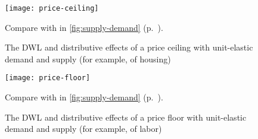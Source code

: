 \begin{figure}[htbp]
	\begin{center}
	\texttt{[image: price-ceiling]}
	\caption[Efficiency and Equity of a Price Ceiling]{The \gls{DWL} and distributive effects of a price ceiling with unit-elastic demand and supply (for example, of housing)}
	\end{center}
	\scriptsize{Compare with  in \autoref{fig:supply-demand} (p.~\pageref{fig:supply-demand}).}
	\label{fig:price-ceiling}
\end{figure}

\begin{figure}[htbp]
	\begin{center}
	\texttt{[image: price-floor]}
	\caption[Efficiency and Equity of a Price Floor]{The \gls{DWL} and distributive effects of a price floor with unit-elastic demand and supply (for example, of labor)}
	\end{center}
	\scriptsize{Compare with  in \autoref{fig:supply-demand} (p.~\pageref{fig:supply-demand}).}
	\label{fig:price-floor}
\end{figure}

